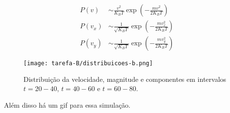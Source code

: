 \begin{align}
    P(v) &\sim \frac{v^2}{K_B T} \exp \left( - \frac{m v^2}{2K_B T} \right)  \\ 
    P(v_x) &\sim \frac{1}{\sqrt{K_B T}}\exp \left( - \frac{m v_x^2}{2K_B T} \right)\\
    P(v_y) &\sim \frac{1}{\sqrt{K_B T}}\exp \left( - \frac{m v_y^2}{2K_B T} \right)
\end{align}





\begin{figure}[h!]
    \centering
    \texttt{[image: tarefa-B/distribuicoes-b.png]}
    \caption{Distribuição da velocidade, magnitude e componentes em intervalos $t=20-40$, $t=40-60$ e $t=60-80$.}
    \label{fig:distribuicoes-velocidade-b}
\end{figure}


Além disso há um gif para essa simulação.

\clearpage